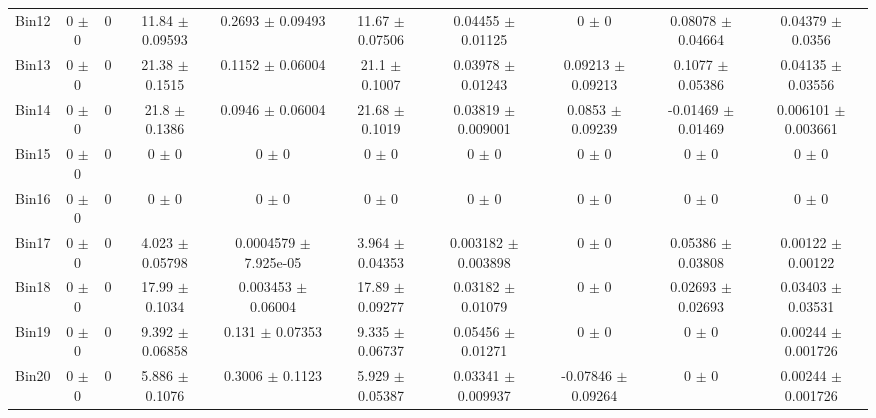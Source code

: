 \begin{tabular}{@{\extracolsep{4pt}}lccccccccc@{}}
     Bin12 & 0 $\pm$ 0 & 0 & 11.84 $\pm$ 0.09593 & 0.2693 $\pm$ 0.09493 & 11.67 $\pm$ 0.07506 & 0.04455 $\pm$ 0.01125 & 0 $\pm$ 0 & 0.08078 $\pm$ 0.04664 & 0.04379 $\pm$ 0.0356 \\ 
     Bin13 & 0 $\pm$ 0 & 0 & 21.38 $\pm$ 0.1515 & 0.1152 $\pm$ 0.06004 & 21.1 $\pm$ 0.1007 & 0.03978 $\pm$ 0.01243 & 0.09213 $\pm$ 0.09213 & 0.1077 $\pm$ 0.05386 & 0.04135 $\pm$ 0.03556 \\ 
     Bin14 & 0 $\pm$ 0 & 0 & 21.8 $\pm$ 0.1386 & 0.0946 $\pm$ 0.06004 & 21.68 $\pm$ 0.1019 & 0.03819 $\pm$ 0.009001 & 0.0853 $\pm$ 0.09239 & -0.01469 $\pm$ 0.01469 & 0.006101 $\pm$ 0.003661 \\ 
     Bin15 & 0 $\pm$ 0 & 0 & 0 $\pm$ 0 & 0 $\pm$ 0 & 0 $\pm$ 0 & 0 $\pm$ 0 & 0 $\pm$ 0 & 0 $\pm$ 0 & 0 $\pm$ 0 \\ 
     Bin16 & 0 $\pm$ 0 & 0 & 0 $\pm$ 0 & 0 $\pm$ 0 & 0 $\pm$ 0 & 0 $\pm$ 0 & 0 $\pm$ 0 & 0 $\pm$ 0 & 0 $\pm$ 0 \\ 
     Bin17 & 0 $\pm$ 0 & 0 & 4.023 $\pm$ 0.05798 & 0.0004579 $\pm$ 7.925e-05 & 3.964 $\pm$ 0.04353 & 0.003182 $\pm$ 0.003898 & 0 $\pm$ 0 & 0.05386 $\pm$ 0.03808 & 0.00122 $\pm$ 0.00122 \\ 
     Bin18 & 0 $\pm$ 0 & 0 & 17.99 $\pm$ 0.1034 & 0.003453 $\pm$ 0.06004 & 17.89 $\pm$ 0.09277 & 0.03182 $\pm$ 0.01079 & 0 $\pm$ 0 & 0.02693 $\pm$ 0.02693 & 0.03403 $\pm$ 0.03531 \\ 
     Bin19 & 0 $\pm$ 0 & 0 & 9.392 $\pm$ 0.06858 & 0.131 $\pm$ 0.07353 & 9.335 $\pm$ 0.06737 & 0.05456 $\pm$ 0.01271 & 0 $\pm$ 0 & 0 $\pm$ 0 & 0.00244 $\pm$ 0.001726 \\ 
     Bin20 & 0 $\pm$ 0 & 0 & 5.886 $\pm$ 0.1076 & 0.3006 $\pm$ 0.1123 & 5.929 $\pm$ 0.05387 & 0.03341 $\pm$ 0.009937 & -0.07846 $\pm$ 0.09264 & 0 $\pm$ 0 & 0.00244 $\pm$ 0.001726 \\ 
\hline\hline
  \end{tabular}
